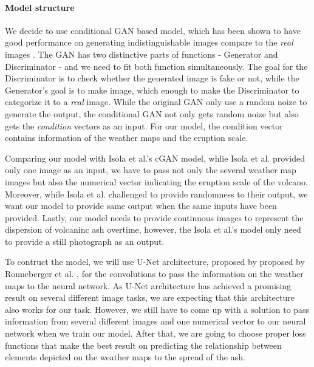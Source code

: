 \documentclass{article}
\begin{document}
\begin{doublespacing}
{  \paragraph{Model structure}
  We decide to use conditional GAN based model, which has been shown to have good performance on 
  generating indistinguishable images compare to the \emph{real} images 
  \cite{isola2016imagetoimage}. The GAN has two distinctive parts of functions - Generator and 
  Discriminator - and we need to fit both function simultaneously. The goal for the Discriminator is
  to check whether the generated image is fake or not, while the Generator's goal is to make image, 
  which enough to make the Discriminator to categorize it to a \emph{real} image. While the original
  GAN only use a random noize to generate the output, the conditional GAN not only gets random noize
  but also gets the \emph{condition} vectors as an input. For our model, the condition vector 
  contains information of the weather maps and the eruption scale.

  Comparing our model with Isola et al.\cite{isola2016imagetoimage}'s cGAN model, whlie Isola et 
  al. provided only one image as an input, we have to pass not only the several weather map images 
  but also the numerical vector indicating the eruption scale of the volcano. Moreover, while Isola 
  et al.\cite{isola2016imagetoimage} challenged to provide randomness to their output, we want our 
  model to provide same output when the same inputs have been provided. Lastly, our model needs to 
  provide continuous images to represent the dispersion of volcaninc ash overtime, however, the 
  Isola et al.\cite{isola2016imagetoimage}'s model only need to provide a still photograph as an 
  output.

  To contruct the model, we will use U-Net architecture, proposed by proposed by Ronneberger et al.
  \cite{ronneberger2015unet}, for the convolutions to pass the information on the weather maps to 
  the neural network. As U-Net architecture has achieved a promising result on several different 
  image tasks\cite{isola2016imagetoimage,james2018simtoreal}, we are expecting that this 
  architecture also works for our task. However, we still have to come up with a solution to pass 
  information from several different images and one numerical vector to our neural network when we 
  train our model. After that, we are going to choose proper loss functions that make the best 
  result on predicting the relationship between elements depicted on the weather maps to the spread 
  of the ash.

}
\end{doublespacing}
\end{document}
